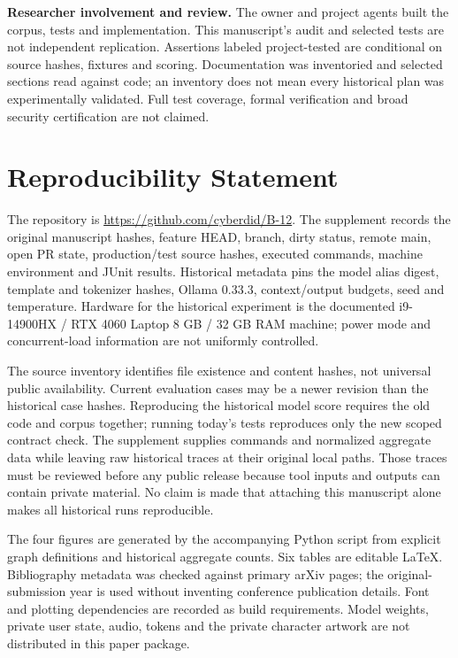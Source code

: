 \documentclass[11pt]{article}
\begin{document}
\textbf{Researcher involvement and review.} The owner and project agents built the corpus, tests and implementation. This manuscript's audit and selected tests are not independent replication. Assertions labeled project-tested are conditional on source hashes, fixtures and scoring. Documentation was inventoried and selected sections read against code; an inventory does not mean every historical plan was experimentally validated. Full test coverage, formal verification and broad security certification are not claimed.

\section{Reproducibility Statement}\label{sec:repro}
The repository is \url{https://github.com/cyberdid/B-12}. The supplement records the original manuscript hashes, feature HEAD, branch, dirty status, remote main, open PR state, production/test source hashes, executed commands, machine environment and JUnit results. Historical metadata pins the model alias digest, template and tokenizer hashes, Ollama 0.33.3, context/output budgets, seed and temperature. Hardware for the historical experiment is the documented i9-14900HX / RTX 4060 Laptop 8 GB / 32 GB RAM machine; power mode and concurrent-load information are not uniformly controlled.

The source inventory identifies file existence and content hashes, not universal public availability. Current evaluation cases may be a newer revision than the historical case hashes. Reproducing the historical model score requires the old code and corpus together; running today's tests reproduces only the new scoped contract check. The supplement supplies commands and normalized aggregate data while leaving raw historical traces at their original local paths. Those traces must be reviewed before any public release because tool inputs and outputs can contain private material. No claim is made that attaching this manuscript alone makes all historical runs reproducible.

The four figures are generated by the accompanying Python script from explicit graph definitions and historical aggregate counts. Six tables are editable LaTeX. Bibliography metadata was checked against primary arXiv pages; the original-submission year is used without inventing conference publication details. Font and plotting dependencies are recorded as build requirements. Model weights, private user state, audio, tokens and the private character artwork are not distributed in this paper package.
\end{document}
